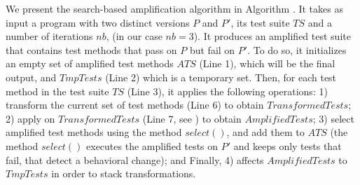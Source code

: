 We present the search-based amplification algorithm in Algorithm .
It takes as input a program with two distinct versions $P$ and $P'$, its test suite $TS$ and a number of iterations $nb$, (in our case $nb=3$).
It produces an amplified test suite that contains test methods that pass on $P$ but fail on $P'$.
To do so, it initializes an empty set of amplified test methods $ATS$ (Line 1), which will be the final output, and $TmpTests$ (Line 2) which is a temporary set.
Then, for each test method in the test suite $TS$ (Line 3), it applies the following operations: 
1) transform the current set of test methods (Line 6) to obtain $TransformedTests$;
2) apply \aampl on $TransformedTests$ (Line 7, see ) to obtain $AmplifiedTests$; 
3) select amplified test methods using the method $select()$, and add them to $ATS$ 
(the method $select()$ executes the amplified tests on $P'$ and keeps only tests that fail, \ie that detect a behavioral change);
and Finally, 4) affects $AmplifiedTests$ to $TmpTests$ in order to stack transformations.

